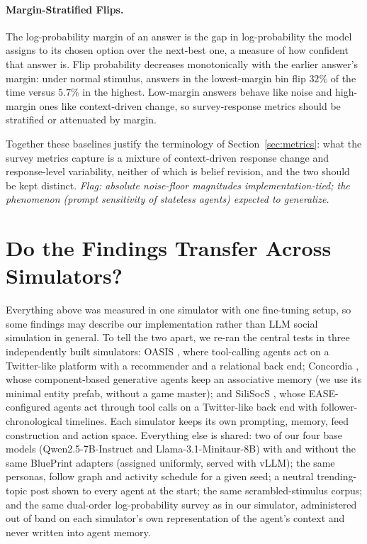 \documentclass[letterpaper]{article} %
\begin{document}
\paragraph{Margin-Stratified Flips.}  The log-probability margin of an answer is the gap in log-probability the model assigns to its chosen option over the next-best one, a measure of how confident that answer is. Flip probability decreases monotonically with the earlier answer's margin: under normal stimulus, answers in the lowest-margin bin flip $32\%$ of the time versus $5.7\%$ in the highest. Low-margin answers behave like noise and high-margin ones like context-driven change, so survey-response metrics should be stratified or attenuated by margin.

Together these baselines justify the terminology of Section~\ref{sec:metrics}: what the survey metrics capture is a mixture of context-driven response change and response-level variability, neither of which is belief revision, and the two should be kept distinct. \emph{Flag: absolute noise-floor magnitudes implementation-tied; the phenomenon (prompt sensitivity of stateless agents) expected to generalize.}


\section{Do the Findings Transfer Across Simulators?}
\label{sec:crosssim}

Everything above was measured in one simulator with one fine-tuning setup, so some findings may describe our implementation rather than LLM social simulation in general. To tell the two apart, we re-ran the central tests in three independently built simulators: OASIS \citep{yang2025oasisopenagentsocial}, where tool-calling agents act on a Twitter-like platform with a recommender and a relational back end; Concordia \citep{vezhnevets2023generative}, whose component-based generative agents keep an associative memory (we use its minimal entity prefab, without a game master); and SiliSocS \citep{sarangi2026ease}, whose EASE-configured agents act through tool calls on a Twitter-like back end with follower-chronological timelines. Each simulator keeps its own prompting, memory, feed construction and action space. Everything else is shared: two of our four base models (Qwen2.5-7B-Instruct and Llama-3.1-Minitaur-8B) with and without the same BluePrint adapters (assigned uniformly, served with vLLM); the same personas, follow graph and activity schedule for a given seed; a neutral trending-topic post shown to every agent at the start; the same scrambled-stimulus corpus; and the same dual-order log-probability survey as in our simulator, administered out of band on each simulator's own representation of the agent's context and never written into agent memory.
\end{document}
